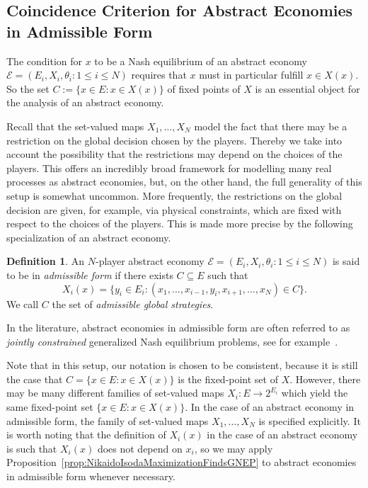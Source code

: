 \documentclass[a4paper,11pt,reqno,english]{amsart}
\theoremstyle{definition}
\newtheorem{definition}[theorem]{Definition}
\begin{document}
\subsection{Coincidence Criterion for Abstract Economies in Admissible Form}

The condition for $x$ to be a Nash equilibrium of an abstract economy $\mathcal{E}=(E_i,X_i,\theta_i\colon 1\leq i\leq N)$ requires that $x$ must in particular fulfill $x\in X(x)$.
So the set $C:= \{x\in E\colon x\in X(x)\}$ of fixed points of $X$ is an essential object for the analysis of an abstract economy.

Recall that the set-valued maps $X_1,\dots,X_N$ model the fact that there may be a restriction on the global decision chosen by the players.
Thereby we take into account the possibility that the restrictions may depend on the choices of the players.
This offers an incredibly broad framework for modelling many real processes as abstract economies, but, on the other hand, the full generality of this setup is somewhat uncommon.
More frequently, the restrictions on the global decision are given, for example, via physical constraints, which are fixed with respect to the choices of the players. This is made more precise by the following specialization of an abstract economy.

\begin{definition}\label{def:AbstractEconomyAdmissibleForm}
	An $N$-player abstract economy $\mathcal{E}=(E_i,X_i,\theta_i\colon 1\leq i\leq N)$ is said to be in \textit{admissible form} if there exists $C\subseteq E$ such that
	\begin{displaymath}
		X_i(x) = \{y_i\in E_i\colon (x_1,\dots,x_{i-1}, y_i, x_{i+1}, \dots, x_N)\in C\}.
	\end{displaymath}
	We call $C$ the set of \textit{admissible global strategies}.
\end{definition}
In the literature, abstract economies in admissible form are often referred to as \textit{jointly constrained} generalized Nash equilibrium problems, see for example~\cite{Stengl2021}.

Note that in this setup, our notation is chosen to be consistent, because it is still the case that $C = \{x\in E\colon x\in X(x)\}$ is the fixed-point set of $X$. However, there may be many different families of set-valued maps $X_i\colon E\longrightarrow 2^{E_i}$ which yield the same fixed-point set $\{x\in E\colon x\in X(x)\}$. In the case of an abstract economy in admissible form, the family of set-valued maps $X_1,\dots,X_N$ is specified explicitly. It is worth noting that the definition of $X_i(x)$ in the case of an abstract economy is such that $X_i(x)$ does not depend on $x_i$, so we may apply Proposition~\ref{prop:NikaidoIsodaMaximizationFindsGNEP} to abstract economies in admissible form whenever necessary.
\end{document}

